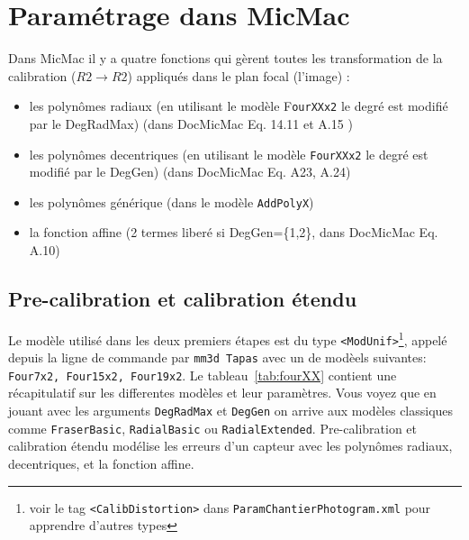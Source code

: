 \documentclass[11pt,a4paper,oneside]{book}
\begin{document}

\section{Paramétrage dans MicMac}
%
Dans MicMac il y a quatre fonctions qui gèrent toutes les transformation de la calibration ($R2 \rightarrow R2$) appliqués dans le plan focal (l'image) :
\begin{itemize}
\item les polynômes radiaux (en utilisant le modèle {F\tt ourXXx2} le degré est modifié par le DegRadMax) (dans DocMicMac Eq. 14.11 et A.15 )
\item les polynômes decentriques (en utilisant le modèle { \tt FourXXx2} le degré est modifié par le DegGen) (dans DocMicMac Eq. A23, A.24) 
\item les polynômes générique (dans le modèle {\tt AddPolyX})
\item la fonction affine (2 termes liberé si DegGen=\{1,2\}, dans DocMicMac Eq. A.10)
\end{itemize}
%
\subsection{Pre-calibration et calibration étendu}
%
Le modèle utilisé dans les deux premiers étapes est du type {\tt <ModUnif>}\footnote{voir le tag {\tt <CalibDistortion>} dans {\tt ParamChantierPhotogram.xml} pour apprendre d'autres types}, appelé depuis la ligne de commande par {\tt mm3d Tapas} avec un de modèels suivantes: {\tt Four7x2, Four15x2, Four19x2}. Le tableau~\ref{tab:fourXX} contient une récapitulatif sur les differentes modèles et leur paramètres. Vous voyez que en jouant avec les arguments {\tt DegRadMax} et {\tt DegGen} on arrive aux modèles classiques comme {\tt FraserBasic}, {\tt RadialBasic} ou {\tt  RadialExtended}. Pre-calibration et calibration étendu modélise les erreurs d'un capteur avec les polynômes radiaux, decentriques, et la fonction affine.
%
\end{document}
